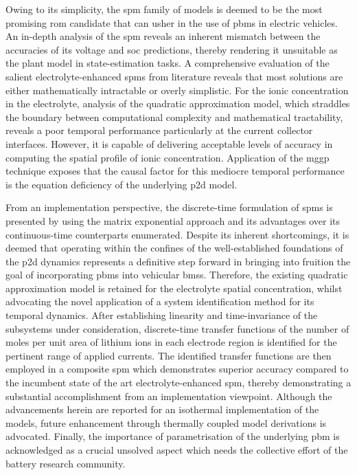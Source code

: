 Owing to its simplicity, the \gls{spm} family of models is deemed to be the most
promising  \gls{rom} candidate  that  can usher  in the  use  of \glspl{pbm}  in
electric vehicles.  An in-depth  analysis of the  \gls{spm} reveals  an inherent
mismatch  between  the accuracies  of  its  voltage and  \gls{soc}  predictions,
thereby rendering it unsuitable as the  plant model in state-estimation tasks. A
comprehensive evaluation  of the  salient electrolyte-enhanced  \glspl{spm} from
literature reveals that most solutions  are either mathematically intractable or
overly  simplistic. For  the ionic  concentration in  the electrolyte,  analysis
of  the quadratic  approximation  model, which  straddles  the boundary  between
computational complexity and mathematical  tractability, reveals a poor temporal
performance particularly  at the  current collector  interfaces. However,  it is
capable of  delivering acceptable  levels of accuracy  in computing  the spatial
profile of ionic concentration. Application  of the \gls{mggp} technique exposes
that the  causal factor for this  mediocre temporal performance is  the equation
deficiency of the underlying \gls{p2d} model.

From an implementation perspective, the discrete-time formulation of \glspl{spm}
is presented  by using the matrix  exponential approach and its  advantages over
its continuous-time counterparts enumerated.  Despite its inherent shortcomings,
it  is  deemed  that  operating  within the  confines  of  the  well-established
foundations of  the \gls{p2d} dynamics  represents a definitive step  forward in
bringing  into fruition  the goal  of incorporating  \glspl{pbm} into  vehicular
\glspl{bms}. Therefore,  the existing quadratic approximation  model is retained
for  the   electrolyte  spatial  concentration,  whilst   advocating  the  novel
application  of  a  system  identification method  for  its  temporal  dynamics.
After  establishing  linearity  and  time-invariance  of  the  subsystems  under
consideration, discrete-time transfer functions of  the number of moles per unit
area of  lithium ions in each  electrode region is identified  for the pertinent
range of applied  currents. The identified transfer functions  are then employed
in a  composite \gls{spm} which  demonstrates superior accuracy compared  to the
incumbent state of the art electrolyte-enhanced \gls{spm}, thereby demonstrating
a  substantial accomplishment  from  an implementation  viewpoint. Although  the
advancements herein are reported for an isothermal implementation of the models,
future  enhancement through  thermally coupled  model derivations  is advocated.
Finally,  the  importance of  parametrisation  of  the underlying  \gls{pbm}  is
acknowledged as a  crucial unsolved aspect which needs the  collective effort of
the battery research community.






